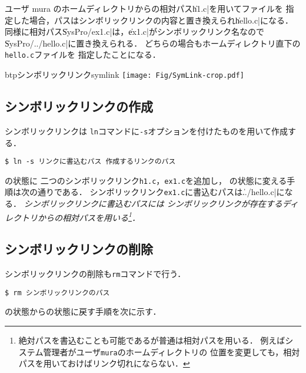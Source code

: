 ユーザ mura のホームディレクトリからの相対パス\|h1.c|を用いてファイルを
指定した場合，パスはシンボリックリンクの内容と置き換えられ\|hello.c|になる．
同様に相対パス\|SysPro/ex1.c|は，\|ex1.c|がシンボリックリンク名なので
\|SysPro/../hello.c|に置き換えられる．
どちらの場合もホームディレクトリ直下の\texttt{hello.c}ファイルを
指定したことになる．

\begin{myfig}{btp}{シンボリックリンク}{symlink}
\texttt{[image: Fig/SymLink-crop.pdf]}
\end{myfig}

\subsection*{シンボリックリンクの作成}
シンボリックリンクは
\texttt{ln}コマンドに\texttt{-s}オプションを付けたものを用いて作成する．

\begin{lstlisting}[numbers=none]
$ ln -s リンクに書込むパス 作成するリンクのパス
\end{lstlisting}

の状態に
二つのシンボリックリンク\texttt{h1.c}，\texttt{ex1.c}を追加し，
の状態に変える手順は次の通りである．
シンボリックリンク\texttt{ex1.c}に書込むパスは\|../hello.c|になる．
\emph{シンボリックリンクに書込むパスには
シンボリックリンクが存在するディレクトリからの相対パスを用いる\footnote{
絶対パスを書込むことも可能であるが普通は相対パスを用いる．
例えばシステム管理者がユーザ\texttt{mura}のホームディレクトリの
位置を変更しても，相対パスを用いておけばリンク切れにならない．}．}



\subsection*{シンボリックリンクの削除}

シンボリックリンクの削除も\texttt{rm}コマンドで行う．

\begin{lstlisting}[numbers=none]
$ rm シンボリックリンクのパス
\end{lstlisting}

の状態からの状態に戻す手順を次に示す．



